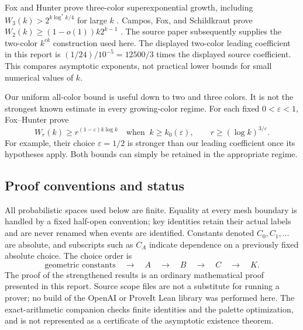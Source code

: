 Fox and Hunter prove three-color superexponential growth, including
\(W_3(k)>2^{k\log^*k/4}\) for large \(k\)
\cite[Theorem 1]{foxHunter2026}.
Campos, Fox, and Schildkraut prove
\(W_2(k)\ge(1-o(1))k2^{k-1}\)
\cite[Theorem 1]{camposFoxSchildkraut2026}.
The source paper \cite{openai160} subsequently supplies the
two-color \(k^{ck}\) construction used here.
The displayed two-color leading coefficient in this report is
\((1/24)/10^{-5}=12500/3\) times the displayed source coefficient.
This compares asymptotic exponents, not practical lower bounds for
small numerical values of \(k\).

Our uniform all-color bound is useful down to two and three colors.
It is not the strongest known estimate in every growing-color regime.
For each fixed \(0<\varepsilon<1\), Fox--Hunter
\cite[Theorem 2]{foxHunter2026} prove
\[
 W_r(k)\ge r^{(1-\varepsilon)k\log k}
 \quad\text{when }\
 k\ge k_0(\varepsilon),\qquad
 r\ge(\log k)^{3/\varepsilon}.
\]
For example, their choice \(\varepsilon=1/2\) is stronger than our
leading coefficient once its hypotheses apply.
Both bounds can simply be retained in the appropriate regime.

\subsection{Proof conventions and status}

All probabilistic spaces used below are finite. Equality at every mesh
boundary is handled by a fixed half-open convention; key identities
retain their actual labels and are never renamed when events are
identified. Constants denoted \(C_0,C_1,\ldots\) are absolute, and
subscripts such as \(C_A\) indicate dependence on a previously fixed
absolute choice. The choice order is
\[
  \text{geometric constants}\quad\longrightarrow\quad A
  \quad\longrightarrow\quad B\quad\longrightarrow\quad C
  \quad\longrightarrow\quad K .
\]
The proof of the strengthened results is an ordinary mathematical
proof presented in this report. Source scope files are not a substitute
for running a prover; no build of the OpenAI or ProveIt Lean library
was performed here. The exact-arithmetic companion checks finite
identities and the palette optimization, and is not represented as a
certificate of the asymptotic existence theorem.
